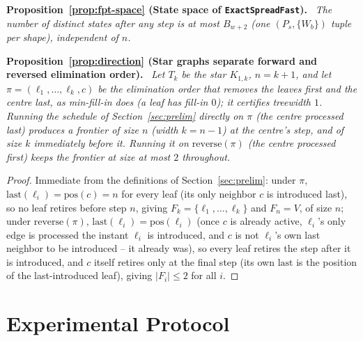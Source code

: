 \documentclass[11pt]{article}
\theoremstyle{definition}
\theoremstyle{remark}
\newenvironment{repeatproposition}[1][]{\par\medskip\noindent\textbf{#1.}\ \itshape}{\par\medskip}
\begin{document}
\begin{repeatproposition}[Proposition~\ref{prop:fpt-space} (State space of \texttt{ExactSpreadFast})]
The number of distinct states after any step is at most $B_{w+2}$ (one
$(P_s,\{W_b\})$ tuple per shape), independent of $n$.
\end{repeatproposition}

\begin{repeatproposition}[Proposition~\ref{prop:direction} (Star graphs separate forward and reversed elimination order)]
Let $T_k$ be the star $K_{1,k}$, $n=k+1$, and let
$\pi=(\ell_1,\dots,\ell_k,c)$ be the elimination order that removes the
leaves first and the centre last, as min-fill-in does (a leaf has fill-in $0$); it certifies
treewidth $1$. Running the schedule of Section~\ref{sec:prelim} directly on
$\pi$ (the centre processed last) produces a frontier of size $n$ (width $k=n-1$) at the centre's step,
and of size $k$ immediately before it. Running it on $\mathrm{reverse}(\pi)$
(the centre processed first) keeps the frontier at size at most $2$
throughout.
\end{repeatproposition}
\begin{proof}
Immediate from the definitions of Section~\ref{sec:prelim}: under $\pi$,
$\mathrm{last}(\ell_i)=\mathrm{pos}(c)=n$ for every leaf (its only neighbor
$c$ is introduced last), so no leaf retires before step $n$, giving
$F_k=\{\ell_1,\dots,\ell_k\}$ and $F_n=V$, of size $n$; under $\mathrm{reverse}(\pi)$,
$\mathrm{last}(\ell_i)=\mathrm{pos}(\ell_i)$ (once $c$ is already active,
$\ell_i$'s only edge is processed the instant $\ell_i$ is introduced, and
$c$ is not $\ell_i$'s own last neighbor to be introduced -- it already was),
so every leaf retires the step after it is introduced, and $c$ itself
retires only at the final step (its own $\mathrm{last}$ is the position of
the last-introduced leaf), giving $|F_i|\le 2$ for all $i$.
\end{proof}

\section{Experimental Protocol}\label{ec:reproducibility}
\end{document}
